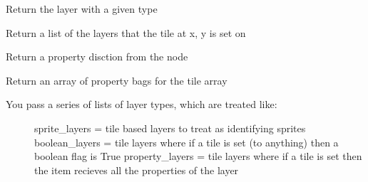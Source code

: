 \documentclass[letterpaper,10pt,english]{sphinxmanual}
\begin{document}
\begin{fulllineitems}

\begin{fulllineitems}
\label{blocks:serge.blocks.tiled.TileMap.getLayersByType}
Return the layer with a given type

\end{fulllineitems}


\begin{fulllineitems}
\label{blocks:serge.blocks.tiled.TileMap.getLayersForTile}
Return a list of the layers that the tile at x, y is set on

\end{fulllineitems}


\begin{fulllineitems}
\label{blocks:serge.blocks.tiled.TileMap.getPropertiesFrom}
Return a property disction from the node

\end{fulllineitems}


\begin{fulllineitems}
\label{blocks:serge.blocks.tiled.TileMap.getPropertyBagArray}
Return an array of property bags for the tile array
\begin{description}
\item[{You pass a series of lists of layer types, which are treated like:}] \leavevmode
sprite\_layers = tile based layers to treat as identifying sprites
boolean\_layers = tile layers where if a tile is set (to anything) then a boolean flag is True
property\_layers = tile layers where if a tile is set then the item recieves all the properties of the layer

\end{description}

\end{fulllineitems}


\end{fulllineitems}
\end{document}

